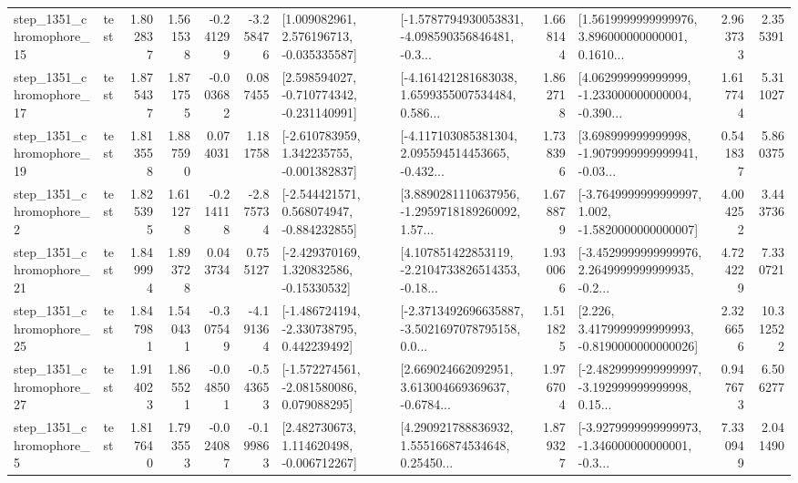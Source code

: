 \begin{tabular}{llrrrrllrlrr}
 step\_1351\_chromophore\_15 &      test &      1.802837 &    1.561538 &     -0.241299 & -3.258476 &    [1.009082961, 2.576196713, -0.035335587] &  [-1.5787794930053831, -4.098590356846481, -0.3... &       1.668144 &  [1.5619999999999976, 3.896000000000001, 0.1610... &            2.963733 &          2.355391 \\
 step\_1351\_chromophore\_17 &      test &      1.875437 &    1.871755 &     -0.003682 &  0.087455 &   [2.598594027, -0.710774342, -0.231140991] &  [-4.161421281683038, 1.6599355007534484, 0.586... &       1.862718 &  [4.062999999999999, -1.233000000000004, -0.390... &            1.617744 &          5.311027 \\
 step\_1351\_chromophore\_19 &      test &      1.813558 &    1.887590 &      0.074031 &  1.181758 &   [-2.610783959, 1.342235755, -0.001382837] &  [-4.117103085381304, 2.095594514453665, -0.432... &       1.738396 &  [3.698999999999998, -1.9079999999999941, -0.03... &            0.541837 &          5.860375 \\
  step\_1351\_chromophore\_2 &      test &      1.825395 &    1.611278 &     -0.214118 & -2.875734 &   [-2.544421571, 0.568074947, -0.884232855] &  [3.8890281110637956, -1.2959718189260092, 1.57... &       1.678879 &  [-3.7649999999999997, 1.002, -1.5820000000000007] &            4.004252 &          3.443736 \\
 step\_1351\_chromophore\_21 &      test &      1.849994 &    1.893728 &      0.043734 &  0.755127 &    [-2.429370169, 1.320832586, -0.15330532] &  [4.107851422853119, -2.2104733826514353, -0.18... &       1.930066 &  [-3.4529999999999976, 2.2649999999999935, -0.2... &            4.724229 &          7.330721 \\
 step\_1351\_chromophore\_25 &      test &      1.847981 &    1.540431 &     -0.307549 & -4.191364 &   [-1.486724194, -2.330738795, 0.442239492] &  [-2.3713492696635887, -3.5021697078795158, 0.0... &       1.511825 &   [2.226, 3.4179999999999993, -0.8190000000000026] &            2.326656 &         10.312522 \\
 step\_1351\_chromophore\_27 &      test &      1.914023 &    1.865521 &     -0.048501 & -0.543653 &   [-1.572274561, -2.081580086, 0.079088295] &  [2.669024662092951, 3.613004669369637, -0.6784... &       1.976704 &  [-2.4829999999999997, -3.192999999999998, 0.15... &            0.947673 &          6.506277 \\
  step\_1351\_chromophore\_5 &      test &      1.817640 &    1.793553 &     -0.024087 & -0.199863 &    [2.482730673, 1.114620498, -0.006712267] &  [4.290921788836932, 1.555166874534648, 0.25450... &       1.879327 &  [-3.9279999999999973, -1.346000000000001, -0.3... &            7.330949 &          2.041490 \\

\end{tabular}
